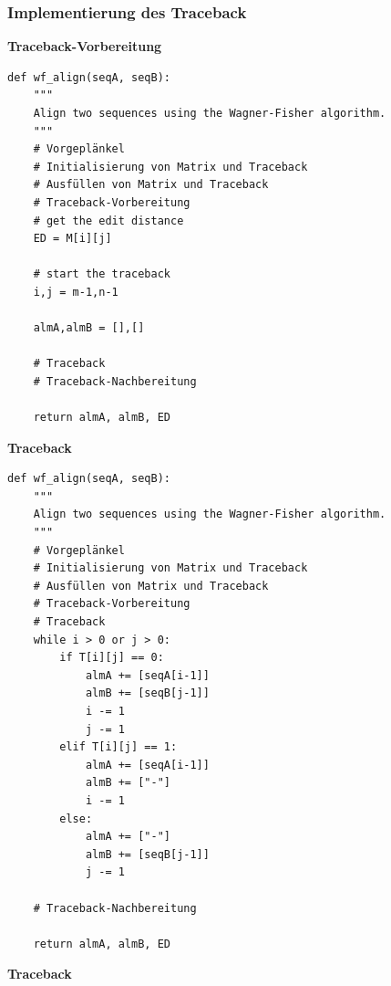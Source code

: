 \subsubsection{\texorpdfstring{{Implementierung des
Traceback}}{Implementierung des Traceback}}

\vspace{0.5cm}\par\noindent\textbf{Traceback-Vorbereitung}\vspace{0.5cm}

\begin{verbatim}
def wf_align(seqA, seqB):
    """
    Align two sequences using the Wagner-Fisher algorithm.
    """
    # Vorgeplänkel
    # Initialisierung von Matrix und Traceback
    # Ausfüllen von Matrix und Traceback
    # Traceback-Vorbereitung
    # get the edit distance
    ED = M[i][j]

    # start the traceback
    i,j = m-1,n-1

    almA,almB = [],[]

    # Traceback
    # Traceback-Nachbereitung

    return almA, almB, ED
\end{verbatim}




\vspace{0.5cm}\par\noindent\textbf{Traceback}\vspace{0.5cm}

\begin{verbatim}
def wf_align(seqA, seqB):
    """
    Align two sequences using the Wagner-Fisher algorithm.
    """
    # Vorgeplänkel
    # Initialisierung von Matrix und Traceback
    # Ausfüllen von Matrix und Traceback
    # Traceback-Vorbereitung
    # Traceback
    while i > 0 or j > 0:
        if T[i][j] == 0:
            almA += [seqA[i-1]]
            almB += [seqB[j-1]]
            i -= 1
            j -= 1
        elif T[i][j] == 1:
            almA += [seqA[i-1]]
            almB += ["-"]
            i -= 1
        else:
            almA += ["-"]
            almB += [seqB[j-1]]
            j -= 1

    # Traceback-Nachbereitung

    return almA, almB, ED
\end{verbatim}




\vspace{0.5cm}\par\noindent\textbf{Traceback}\vspace{0.5cm}

